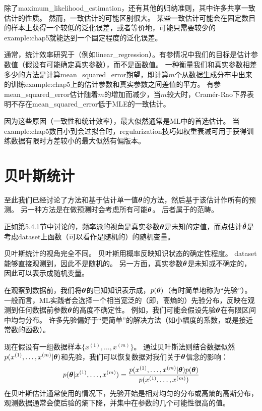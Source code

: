 除了\gls{maximum_likelihood_estimation}，还有其他的归纳准则，其中许多共享一致估计的性质。
然而，一致估计的可能区别很大。
某些一致估计可能会在固定数目的样本上获得一个较低的泛化误差，或者等价地，可能只需要较少的\gls{example:chap5}就能达到一个固定程度的泛化误差。

通常，统计效率研究于（例如\gls{linear_regression}）。有参情况中我们的目标是估计参数值（假设有可能确定真实参数），而不是函数值。
一种衡量我们和真实参数相差多少的方法是计算\gls{mean_squared_error}期望，即计算$m$个从数据生成分布中出来的训练\gls{example:chap5}上的估计参数和真实参数之间差值的平方。
有参\gls{mean_squared_error}估计随着$m$的增加而减少，当$m$较大时，Cram\'er-Rao下界\citep{Rao-1945,Cramer-1946}表明不存在\gls{mean_squared_error}低于\gls{MLE}的一致估计。

因为这些原因（一致性和统计效率），最大似然通常是\gls{ML}中的首选估计。
当\gls{example:chap5}数目小到会过拟合时，\gls{regularization}技巧如权重衰减可用于获得训练数据有限时方差较小的最大似然有偏版本。


\section{贝叶斯统计}
\label{sec:bayesian_statistics}
至此我们已经讨论了方法和基于估计单一值$\boldsymbol{\theta}$的方法，然后基于该估计作所有的预测。
另一种方法是在做预测时会考虑所有可能$\boldsymbol{\theta}$。
后者属于的范畴。

正如第5.4.1节中讨论的，频率派的视角是真实参数$\boldsymbol{\theta}$是未知的定值，而点估计$\hat{\boldsymbol{\theta}}$是考虑\gls{dataset}上函数（可以看作是随机的）的随机变量。

贝叶斯统计的视角完全不同。
贝叶斯用概率反映知识状态的确定性程度。
\gls{dataset}能够直接观测到，因此不是随机的。
另一方面，真实参数$\boldsymbol{\theta}$是未知或不确定的，因此可以表示成随机变量。

在观察到数据前，我们将$\boldsymbol{\theta}$的已知知识表示成，$p(\boldsymbol{\theta})$（有时简单地称为``先验''）。
一般而言，\gls{ML}实践者会选择一个相当宽泛的（即，高熵的）先验分布，反映在观测到任何数据前参数$\boldsymbol{\theta}$的高度不确定性。
例如，我们可能会假设先验$\boldsymbol{\theta}$在有限区间中均匀分布。
许多先验偏好于``更简单''的解决方法（如小幅度的系数，或是接近常数的函数）。

现在假设有一组数据样本$\{x^{(1)},\dots,x^{(m)}\}$。
通过贝叶斯法则结合数据似然$p(x^{(1)},\dots,x^{(m)}|\boldsymbol{\theta})$和先验，我们可以恢复数据对我们关于$\boldsymbol{\theta}$信念的影响：
\begin{equation}
        p(\boldsymbol{\theta}|x^{(1)},\dots,x^{(m)}) = 
        \frac{p(x^{(1)},\dots,x^{(m)}|\boldsymbol{\theta}) p(\boldsymbol{\theta})}
            {p(x^{(1)},\dots,x^{(m)})}
\end{equation}
在贝叶斯估计通常使用的情况下，先验开始是相对均匀的分布或高熵的高斯分布，观测数据通常会使后验的熵下降，并集中在参数的几个可能性很高的值。

